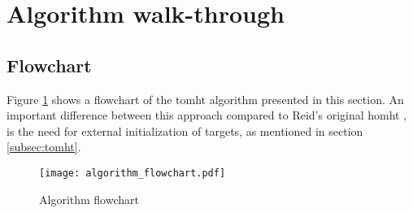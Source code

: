 \section{Algorithm walk-through}
\label{sec:algorithm}
\subsection{Flowchart}
Figure \ref{fig:algorithm_flow} shows a flowchart of the \gls{tomht} algorithm presented in this section. An important difference between this approach compared to Reid's original \gls{homht} \cite{Reid1979}, is the need for external initialization of \glspl{target}, as mentioned in section \ref{subsec:tomht}.

\begin{figure}[H]
\centering
\texttt{[image: algorithm\_flowchart.pdf]}
\caption{Algorithm flowchart}
\label{fig:algorithm_flow}
\end{figure}

